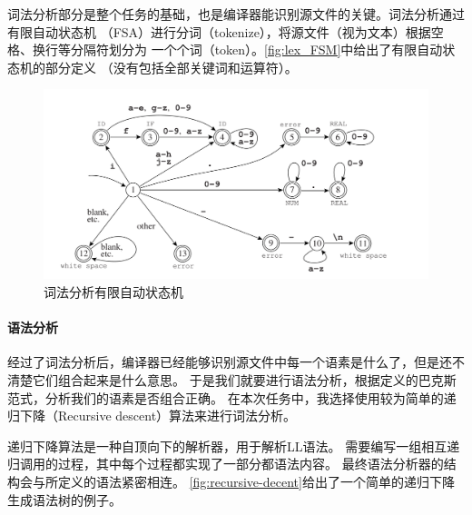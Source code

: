 词法分析部分是整个任务的基础，也是编译器能识别源文件的关键。词法分析通过有限自动状态机
（FSA）进行分词（tokenize），将源文件（视为文本）根据空格、换行等分隔符划分为
一个个词（token）。\autoref{fig:lex_FSM}中给出了有限自动状态机的部分定义
（没有包括全部关键词和运算符）。

\begin{figure}[hbt]
  \centering
  \includegraphics[scale=.25]{FSM1.png}
  \caption{词法分析有限自动状态机}\label{fig:lex_FSM}
\end{figure}

\paragraph{语法分析}

经过了词法分析后，编译器已经能够识别源文件中每一个语素是什么了，但是还不清楚它们组合起来是什么意思。
于是我们就要进行语法分析，根据定义的巴克斯范式，分析我们的语素是否组合正确。
在本次任务中，我选择使用较为简单的递归下降（Recursive descent）算法来进行词法分析。
\cite{53e9b0b2b7602d9703b20db9,Recursive-programming,appel2004modern,muchnick1997advanced,aho1986compilers}

递归下降算法是一种自顶向下的解析器，用于解析LL语法\cite{aho1986compilers}。
需要编写一组相互递归调用的过程，其中每个过程都实现了一部分都语法内容。
最终语法分析器的结构会与所定义的语法紧密相连。
\autoref{fig:recursive-decent}给出了一个简单的递归下降生成语法树的例子。

